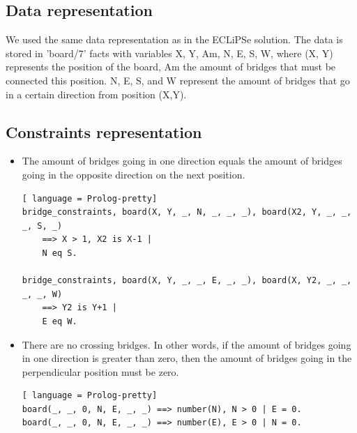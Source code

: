 \documentclass{report}
\begin{document}
\subsection{Data representation}
We used the same data representation as in the ECLiPSe solution. The data is stored in 'board/7' facts with variables X, Y, Am, N, E, S, W, where (X, Y) represents the position of the board, Am the amount of bridges that must be connected this position. N, E, S, and W represent the amount of bridges that go in a certain direction from position (X,Y).

\subsection{Constraints representation}
\begin{itemize}
	\item The amount of bridges going in one direction equals the amount of bridges going in the opposite direction on the next position.
\begin{lstlisting}[ language = Prolog-pretty]
bridge_constraints, board(X, Y, _, N, _, _, _), board(X2, Y, _, _, _, S, _)
    ==> X > 1, X2 is X-1 |
    N eq S.

bridge_constraints, board(X, Y, _, _, E, _, _), board(X, Y2, _, _, _, _, W)
    ==> Y2 is Y+1 |
    E eq W.
\end{lstlisting}

	\item There are no crossing bridges. In other words, if the amount of bridges going in one direction is greater than zero, then the amount of bridges going in the perpendicular position must be zero.
\begin{lstlisting}[ language = Prolog-pretty]
board(_, _, 0, N, E, _, _) ==> number(N), N > 0 | E = 0.
board(_, _, 0, N, E, _, _) ==> number(E), E > 0 | N = 0.
\end{lstlisting}


\end{itemize}
\end{document}
